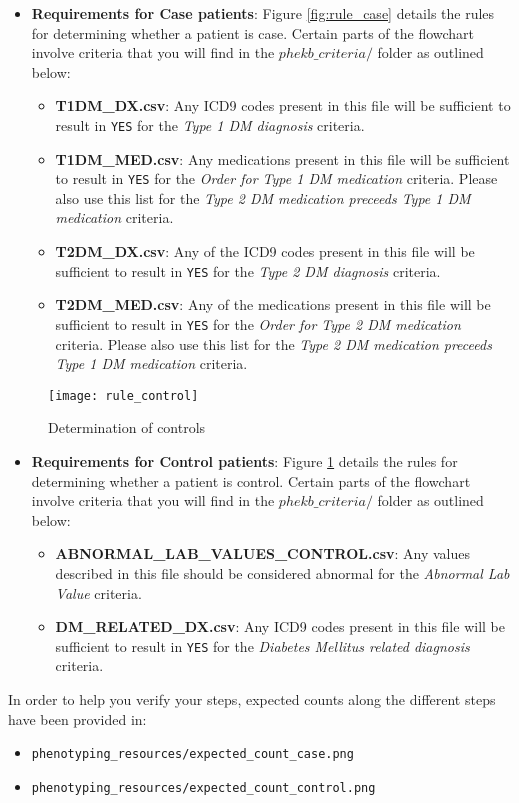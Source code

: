\documentclass[12pt]{article}
\begin{document}
\begin{itemize}
\item \textbf{Requirements for Case patients}: Figure \ref{fig:rule_case} details the rules for determining whether a patient is case. Certain parts of the flowchart involve criteria that you will find in the $phekb\_criteria/$ folder as outlined below:

\begin{itemize}
\item \textbf{T1DM\_DX.csv}: Any ICD9 codes present in this file will be sufficient to result in \texttt{YES} for the \textit{Type 1 DM diagnosis} criteria.
\item \textbf{T1DM\_MED.csv}: Any medications present in this file will be sufficient to result in \texttt{YES} for the \textit{Order for Type 1 DM medication} criteria. Please also use this list for the \textit{Type 2 DM medication preceeds Type 1 DM medication} criteria.
\item \textbf{T2DM\_DX.csv}: Any of the ICD9 codes present in this file will be sufficient to result in \texttt{YES} for the \textit{Type 2 DM diagnosis} criteria.
\item \textbf{T2DM\_MED.csv}: Any of the medications present in this file will be sufficient to result in \texttt{YES} for the \textit{Order for Type 2 DM medication} criteria. Please also use this list for the \textit{Type 2 DM medication preceeds Type 1 DM medication} criteria.
\end{itemize}
\end{itemize}

\begin{figure}[!h]
  \centering
  \texttt{[image: rule\_control]}
  \caption{Determination of controls}
  \label{fig:rule_control}
\end{figure}

\begin{itemize}
\item \textbf{Requirements for Control patients}: Figure \ref{fig:rule_control} details the rules for determining whether a patient is control. Certain parts of the flowchart involve criteria that you will find in the $phekb\_criteria/$ folder as outlined below:

\begin{itemize}
\item \textbf{ABNORMAL\_LAB\_VALUES\_CONTROL.csv}: Any values described in this file should be considered abnormal for the \textit{Abnormal Lab Value} criteria. 
\item \textbf{DM\_RELATED\_DX.csv}: Any ICD9 codes present in this file will be sufficient to result in \texttt{YES} for the \textit{Diabetes Mellitus related diagnosis} criteria.
\end{itemize}
\end{itemize}
In order to help you verify your steps, expected counts along the different steps have been provided in:
\begin{itemize}
\item \texttt{phenotyping\_resources/expected\_count\_case.png}
\item \texttt{phenotyping\_resources/expected\_count\_control.png}
\end{itemize}
\end{document}
